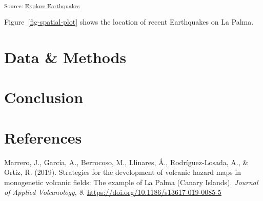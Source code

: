 \documentclass[
]{agujournal2019}
\newlength{\cslhangindent}
\newenvironment{CSLReferences}[2] %
 {\begin{list}{}{%
  \setlength{\itemindent}{0pt}
  \setlength{\leftmargin}{0pt}
  \setlength{\parsep}{0pt}
  \ifodd #1
   \setlength{\leftmargin}{\cslhangindent}
   \setlength{\itemindent}{-1\cslhangindent}
  \fi
  \setlength{\itemsep}{#2\baselineskip}}}
 {\end{list}}
\begin{document}
\textsubscript{Source:
\href{https://arbones.github.io/TFM/notebooks/explore-earthquakes-preview.html\#cell-fig-spatial-plot}{Explore
Earthquakes}}

Figure~\ref{fig-spatial-plot} shows the location of recent Earthquakes
on La Palma.

\section{Data \& Methods}\label{sec-data-methods}

\section{Conclusion}\label{conclusion}

\section*{References}\label{references}

\label{refs}
\begin{CSLReferences}{1}{0}
\vspace{1em}

Marrero, J., García, A., Berrocoso, M., Llinares, Á., Rodríguez-Losada,
A., \& Ortiz, R. (2019). Strategies for the development of volcanic
hazard maps in monogenetic volcanic fields: The example of {La} {Palma}
({Canary} {Islands}). \emph{Journal of Applied Volcanology}, \emph{8}.
\url{https://doi.org/10.1186/s13617-019-0085-5}

\end{CSLReferences}
\end{document}
